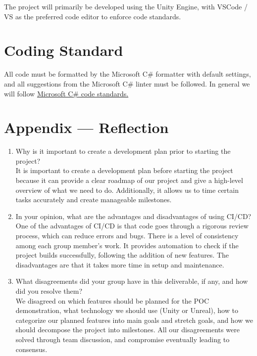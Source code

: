 \documentclass{article}
\begin{document}
The project will primarily be developed using the Unity Engine, 
with VSCode / VS as the preferred code editor to enforce code standards. \\


\section{Coding Standard}

All code must be formatted by the Microsoft C\# formatter with default settings, 
and all suggestions from the Microsoft C\# linter must be followed. 
In general we will follow \href{https://learn.microsoft.com/en-us/dotnet/csharp/fundamentals/coding-style/coding-conventions}{Microsoft C\# code standards.}

\newpage{}

\section*{Appendix --- Reflection}



\begin{enumerate}
    \item Why is it important to create a development plan prior to starting the
    project? \\
    
    It is important to create a development plan before starting the project because it can provide a clear roadmap of our project and give a high-level overview of what we need to do. Additionally, it allows us to time certain tasks accurately and create manageable milestones.

    \item In your opinion, what are the advantages and disadvantages of using
    CI/CD? \\

    One of the advantages of CI/CD is that code goes through a rigorous review process, which can reduce errors and bugs. There is a level of consistency among each group member’s work. It provides automation to check if the project builds successfully, following the addition of new features. The disadvantages are that it takes more time in setup and maintenance. 
    
    \item What disagreements did your group have in this deliverable, if any,
    and how did you resolve them? \\

    We disagreed on which features should be planned for the POC demonstration, what technology we should use (Unity or Unreal), how to categorize our planned features into main goals and stretch goals, and how we should decompose the project into milestones. All our disagreements were solved through team discussion, and compromise eventually leading to consensus.
\end{enumerate}
\end{document}
